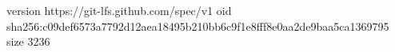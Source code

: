 version https://git-lfs.github.com/spec/v1
oid sha256:c09def6573a7792d12aea18495b210bb6c9f1e8fff8e0aa2de9baa5ca1369795
size 3236
